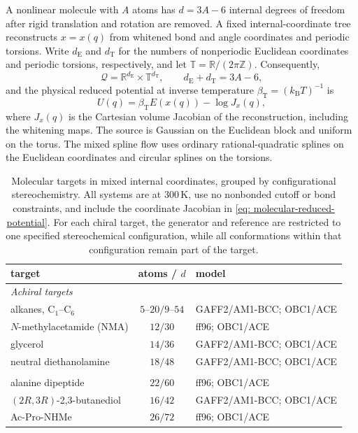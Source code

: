 \documentclass{article}
\begin{document}
A nonlinear molecule with \(A\) atoms has \(d=3A-6\) internal degrees of freedom after rigid translation and rotation are removed. A fixed internal-coordinate tree reconstructs \(x=x(q)\) from whitened bond and angle coordinates and periodic torsions. Write $d_{\mathrm E}$ and $d_{\mathrm T}$ for the numbers of nonperiodic Euclidean coordinates and periodic torsions, respectively, and let $\mathbb T=\mathbb R/(2\pi\mathbb Z)$. Consequently,
\begin{equation*}
\mathcal Q=\mathbb R^{d_{\mathrm E}}\times\mathbb T^{d_{\mathrm T}},
\qquad d_{\mathrm E}+d_{\mathrm T}=3A-6,
\end{equation*}
and the physical reduced potential at inverse temperature \(\beta_{\mathrm T}=(k_{\mathrm B}T)^{-1}\) is
\begin{equation}
U(q)=\beta_{\mathrm T} E(x(q))-\log J_x(q),
\label{eq: molecular-reduced-potential}
\end{equation}
where \(J_x(q)\) is the Cartesian volume Jacobian of the reconstruction, including the whitening maps. The source is Gaussian on the Euclidean block and uniform on the torus. The mixed spline flow uses ordinary rational-quadratic splines on the Euclidean coordinates and circular splines on the torsions.

\begin{table}[htb]
\centering
\begin{tabular}{lcl}
\toprule
target & atoms / \(d\) & model \\
\midrule
\multicolumn{3}{l}{\emph{Achiral targets}} \\
\addlinespace[2pt]
alkanes, \(\mathrm C_1\)--\(\mathrm C_6\)
& \(5\text{--}20/9\text{--}54\)
& GAFF2/AM1-BCC; OBC1/ACE \\
\(N\)-methylacetamide (NMA)
& \(12/30\)
& ff96; OBC1/ACE \\
glycerol
& \(14/36\)
& GAFF2/AM1-BCC; OBC1/ACE \\
neutral diethanolamine
& \(18/48\)
& GAFF2/AM1-BCC; OBC1/ACE \\
\addlinespace
\multicolumn{3}{l}{\emph{Chiral targets: one fixed stereochemical configuration}} \\
\addlinespace[2pt]
alanine dipeptide
& \(22/60\)
& ff96; OBC1/ACE \\
\((2R,3R)\)-2,3-butanediol
& \(16/42\)
& GAFF2/AM1-BCC; OBC1/ACE \\
Ac-Pro-NHMe
& \(26/72\)
& ff96; OBC1/ACE \\
\bottomrule
\end{tabular}
\caption{Molecular targets in mixed internal coordinates, grouped by configurational stereochemistry. All systems are at \(300\,\mathrm K\), use no nonbonded cutoff or bond constraints, and include the coordinate Jacobian in \eqref{eq: molecular-reduced-potential}. For each chiral target, the generator and reference are restricted to one specified stereochemical configuration, while all conformations within that configuration remain part of the target.}
\label{tab: molecular-targets}
\end{table}
\end{document}
